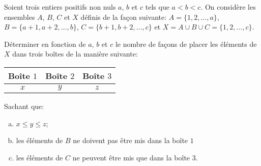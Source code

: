 \documentclass[varwidth]{standalone}
\begin{document}
    Soient trois entiers positifs non nuls $a$, $b$ et $c$ tels que $a < b < c$. On consid\`ere les ensembles $A$, $B$, $C$ et $X$ d\'efinis de la fa\c con suivante:
    $A = \{1, 2, \dots, a\}$, $B = \{a + 1, a + 2, \dots, b\}$, $C = \{b + 1, b + 2, \dots, c\}$ et $X = A \cup B \cup C = \{1, 2, \dots, c\}$.

    D\'eterminer en fonction de $a$, $b$ et $c$ le nombre de fa\c cons de placer les \'el\'ements de $X$ dans trois bo\^ites de la mani\`ere suivante:
    
    \begin{center}
        \begin{tabular}{|c|c|c|}
            \hline
            Bo\^ite $1$ & Bo\^ite $2$ & Bo\^ite $3$ \\
            \hline
            $x$ & $y$ & $z$ \\
            \hline
        \end{tabular}
    \end{center}

    Sachant que:
    \begin{enumerate}[a)]
        \item $x \leq y \leq z$;
        \item les \'el\'ements de $B$ ne doivent pas \^etre mis dans la bo\^ite $1$
        \item les \'el\'ements de $C$ ne peuvent \^etre mis que dans la bo\^ite $3$.
    \end{enumerate}
\end{document}
